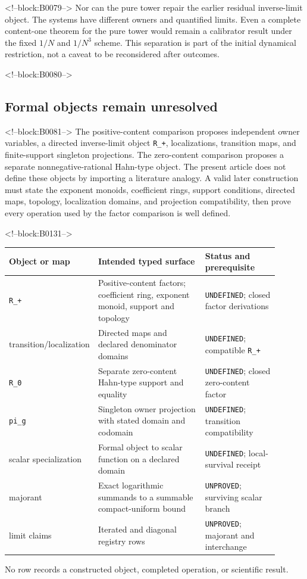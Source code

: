 \documentclass[11pt]{article}
\begin{document}
<!--block:B0079-->
Nor can the pure tower repair the earlier residual inverse-limit object.
The systems have different owners and quantified limits. Even a
complete content-one theorem for the pure tower would remain a
calibrator result under the fixed $1/N$ and $1/N^3$ scheme. This
separation is part of the initial dynamical restriction, not a caveat to
be reconsidered after outcomes.

<!--block:B0080-->
\hypertarget{45-formal-objects-remain-unresolved}{%
\subsection{Formal objects remain
unresolved}\label{45-formal-objects-remain-unresolved}}

<!--block:B0081-->
The positive-content comparison proposes independent owner variables, a
directed inverse-limit object \texttt{R\_+}, localizations, transition
maps, and finite-support singleton projections. The zero-content
comparison proposes a separate nonnegative-rational Hahn-type object.
The present article does not define these objects by importing a literature
analogy. A valid later construction must state the exponent monoids,
coefficient rings, support conditions, directed maps, topology,
localization domains, and projection compatibility, then prove every
operation used by the factor comparison is well defined.

<!--block:B0131-->
\begin{center}
\small
\begin{tabular}{p{0.19\linewidth}p{0.42\linewidth}p{0.29\linewidth}}
\toprule
Object or map & Intended typed surface & Status and prerequisite \\
\midrule
\texttt{R\_+} & Positive-content factors; coefficient ring, exponent monoid, support and topology & \texttt{UNDEFINED}; closed factor derivations \\
transition/localization & Directed maps and declared denominator domains & \texttt{UNDEFINED}; compatible \texttt{R\_+} \\
\texttt{R\_0} & Separate zero-content Hahn-type support and equality & \texttt{UNDEFINED}; closed zero-content factor \\
\texttt{pi\_g} & Singleton owner projection with stated domain and codomain & \texttt{UNDEFINED}; transition compatibility \\
scalar specialization & Formal object to scalar function on a declared domain & \texttt{UNDEFINED}; local-survival receipt \\
majorant & Exact logarithmic summands to a summable compact-uniform bound & \texttt{UNPROVED}; surviving scalar branch \\
limit claims & Iterated and diagonal registry rows & \texttt{UNPROVED}; majorant and interchange \\
\bottomrule
\end{tabular}
\end{center}
No row records a constructed object, completed operation, or scientific
result.
\end{document}

